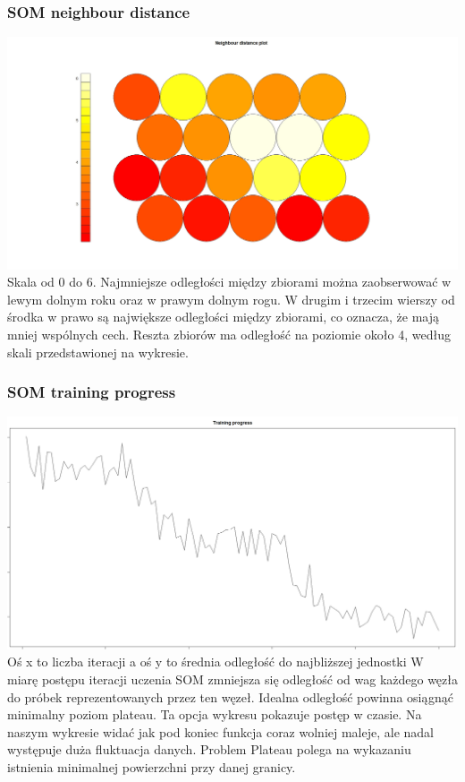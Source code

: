 \documentclass{article}
\begin{document}
        \subsubsection{SOM neighbour distance}
            \includegraphics[width = \textwidth]{som_neighbour_dist_fig.jpeg}
            Skala od 0 do 6. Najmniejsze odległości między zbiorami można zaobserwować w lewym dolnym roku oraz w prawym dolnym rogu. 
            W drugim i trzecim wierszy od środka w prawo są największe odległości między zbiorami, co oznacza, że mają mniej wspólnych cech. 
            Reszta zbiorów ma odległość na poziomie około 4, według skali przedstawionej na wykresie. 

        \subsubsection{SOM training progress}
            \includegraphics[width = \textwidth]{som_changes_fig.jpeg}
            Oś x to liczba iteracji a oś y to średnia odległość do najbliższej jednostki
            W miarę postępu iteracji uczenia SOM zmniejsza się odległość od wag każdego węzła do próbek reprezentowanych przez ten węzeł.
            Idealna odległość powinna osiągnąć minimalny poziom plateau. Ta opcja wykresu pokazuje postęp w czasie. Na naszym wykresie widać 
            jak pod koniec funkcja coraz wolniej maleje, ale nadal występuje duża fluktuacja danych. 
            Problem Plateau polega na wykazaniu istnienia minimalnej powierzchni przy danej granicy.
\end{document}
